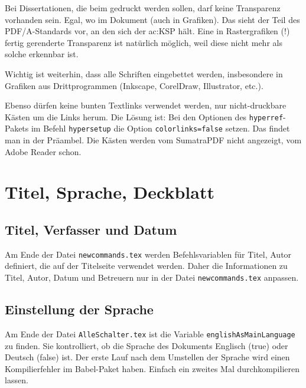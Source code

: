 Bei Dissertationen, die beim  gedruckt werden sollen, darf keine Transparenz vorhanden sein. Egal, wo im Dokument (auch in Grafiken).
Das sieht der Teil des PDF/A-Standards vor, an den sich der \gls{ac:KSP} hält. Eine in Rastergrafiken (!) fertig gerenderte Transparenz ist natürlich möglich, weil diese nicht mehr als solche erkennbar ist.

Wichtig ist weiterhin, dass alle Schriften eingebettet werden, insbesondere in Grafiken aus Drittprogrammen (Inkscape, CorelDraw, Illustrator, etc.).

Ebenso dürfen keine bunten Textlinks verwendet werden, nur nicht-druckbare Kästen um die Links herum. Die	Lösung ist: Bei den Optionen des \texttt{hyperref}-Pakets im Befehl \texttt{hypersetup} die Option \texttt{colorlinks=false} setzen. Das findet man in der Präambel. Die Kästen werden vom SumatraPDF nicht angezeigt, vom Adobe Reader schon.

\section{Titel, Sprache, Deckblatt}
\subsection{Titel, Verfasser und Datum}
Am Ende der Datei \texttt{newcommands.tex} werden Befehlsvariablen für Titel, Autor \usw definiert, die auf der Titelseite verwendet werden. Daher die Informationen zu Titel, Autor, Datum und Betreuern nur in der Datei \texttt{newcommands.tex} anpassen.

\subsection{Einstellung der Sprache}
Am Ende der Datei \texttt{AlleSchalter.tex} ist die Variable \texttt{englishAsMainLanguage} zu finden. Sie kontrolliert, ob die Sprache des Dokuments Englisch (true) oder Deutsch (false) ist.
Der erste Lauf nach dem Umstellen der Sprache wird einen Kompilierfehler im Babel-Paket haben. Einfach ein zweites Mal durchkompilieren lassen.

